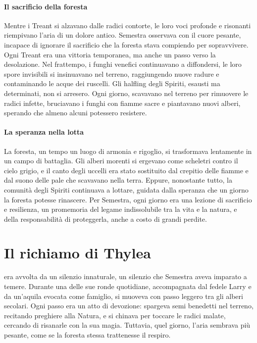 \documentclass[letterpaper,twocolumn,openany,nodeprecatedcode]{dndbook}
\newcommand{\Cap}[2]{\DndDropCapLine{#1}{#2}}
\begin{document}
\paragraph{Il sacrificio della foresta}  
Mentre i Treant si alzavano dalle radici contorte, le loro voci profonde e risonanti riempivano l’aria di un dolore antico. Semestra osservava con il cuore pesante, incapace di ignorare il sacrificio che la foresta stava compiendo per sopravvivere. Ogni Treant era una vittoria temporanea, ma anche un passo verso la desolazione. Nel frattempo, i funghi venefici continuavano a diffondersi, le loro spore invisibili si insinuavano nel terreno, raggiungendo nuove radure e contaminando le acque dei ruscelli. Gli halfling degli Spiriti, esausti ma determinati, non si arresero. Ogni giorno, scavavano nel terreno per rimuovere le radici infette, bruciavano i funghi con fiamme sacre e piantavano nuovi alberi, sperando che almeno alcuni potessero resistere.

\paragraph{La speranza nella lotta}  
La foresta, un tempo un luogo di armonia e rigoglio, si trasformava lentamente in un campo di battaglia. Gli alberi morenti si ergevano come scheletri contro il cielo grigio, e il canto degli uccelli era stato sostituito dal crepitio delle fiamme e dal suono delle pale che scavavano nella terra. Eppure, nonostante tutto, la comunità degli Spiriti continuava a lottare, guidata dalla speranza che un giorno la foresta potesse rinascere. Per Semestra, ogni giorno era una lezione di sacrificio e resilienza, un promemoria del legame indissolubile tra la vita e la natura, e della responsabilità di proteggerla, anche a costo di grandi perdite.

\section{Il richiamo di Thylea}

\Cap{L}{a foresta Alta} era avvolta da un silenzio innaturale, un silenzio che Semestra aveva imparato a temere. Durante una delle sue ronde quotidiane, accompagnata dal fedele Larry e da un’aquila evocata come famiglio, si muoveva con passo leggero tra gli alberi secolari. Ogni passo era un atto di devozione: spargeva semi benedetti nel terreno, recitando preghiere alla Natura, e si chinava per toccare le radici malate, cercando di risanarle con la sua magia. Tuttavia, quel giorno, l’aria sembrava più pesante, come se la foresta stessa trattenesse il respiro.
\end{document}
